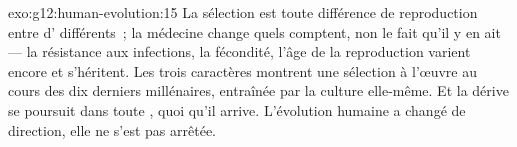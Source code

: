 \begin{solution}{exo:g12:human-evolution:15}
La sélection est toute différence de reproduction entre 
d' différents~; la médecine change quels  comptent, non
le fait qu'il y en ait --- la résistance aux infections, la fécondité,
l'âge de la reproduction varient encore et s'héritent. Les trois
caractères montrent une sélection à l'œuvre au cours des dix derniers
millénaires, entraînée par la culture elle-même. Et la dérive se
poursuit dans toute , quoi qu'il arrive. L'évolution humaine
a changé de direction, elle ne s'est pas arrêtée.
\end{solution}


